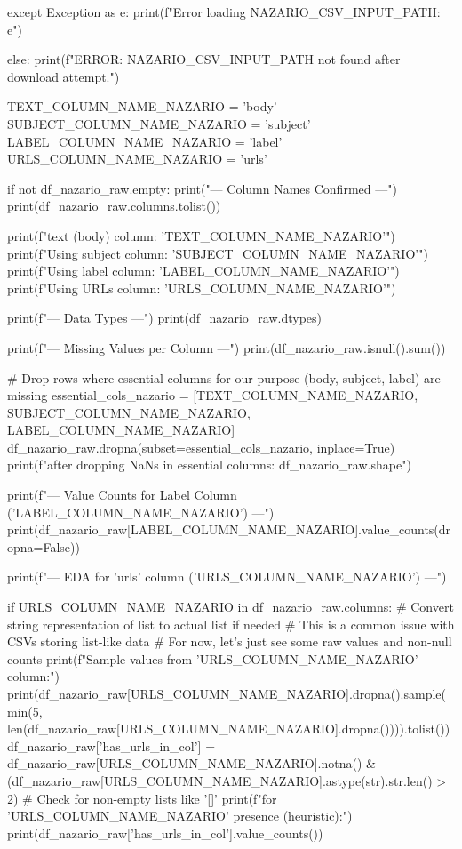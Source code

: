 \begin{ffcode}
    except Exception as e:
        print(f"Error loading {NAZARIO_CSV_INPUT_PATH}: {e}")

else:
    print(f"ERROR: {NAZARIO_CSV_INPUT_PATH} not found after download attempt.")

    TEXT_COLUMN_NAME_NAZARIO = 'body'
    SUBJECT_COLUMN_NAME_NAZARIO = 'subject'
    LABEL_COLUMN_NAME_NAZARIO = 'label'
    URLS_COLUMN_NAME_NAZARIO = 'urls'
    
    if not df_nazario_raw.empty:
        print("--- Column Names Confirmed ---")
        print(df_nazario_raw.columns.tolist())
    
        print(f"\nUsing text (body) column: '{TEXT_COLUMN_NAME_NAZARIO}'")
        print(f"Using subject column: '{SUBJECT_COLUMN_NAME_NAZARIO}'")
        print(f"Using label column: '{LABEL_COLUMN_NAME_NAZARIO}'")
        print(f"Using URLs column: '{URLS_COLUMN_NAME_NAZARIO}'")
    
        print(f"\n--- Data Types ---")
        print(df_nazario_raw.dtypes)
    
        print(f"\n--- Missing Values per Column ---")
        print(df_nazario_raw.isnull().sum())
    
        # Drop rows where essential columns for our purpose (body, subject, label) are missing
        essential_cols_nazario = [TEXT_COLUMN_NAME_NAZARIO, SUBJECT_COLUMN_NAME_NAZARIO, LABEL_COLUMN_NAME_NAZARIO]
        df_nazario_raw.dropna(subset=essential_cols_nazario, inplace=True)
        print(f"\nShape after dropping NaNs in essential columns: {df_nazario_raw.shape}")
    
        print(f"\n--- Value Counts for Label Column ('{LABEL_COLUMN_NAME_NAZARIO}') ---")
        print(df_nazario_raw[LABEL_COLUMN_NAME_NAZARIO].value_counts(dropna=False))
    
        print(f"\n--- EDA for 'urls' column ('{URLS_COLUMN_NAME_NAZARIO}') ---")
    
        if URLS_COLUMN_NAME_NAZARIO in df_nazario_raw.columns:
            # Convert string representation of list to actual list if needed
            # This is a common issue with CSVs storing list-like data
            # For now, let's just see some raw values and non-null counts
            print(f"Sample values from '{URLS_COLUMN_NAME_NAZARIO}' column:")
            print(df_nazario_raw[URLS_COLUMN_NAME_NAZARIO].dropna().sample(min(5, len(df_nazario_raw[URLS_COLUMN_NAME_NAZARIO].dropna()))).tolist())
            df_nazario_raw['has_urls_in_col'] = df_nazario_raw[URLS_COLUMN_NAME_NAZARIO].notna() & (df_nazario_raw[URLS_COLUMN_NAME_NAZARIO].astype(str).str.len() > 2) # Check for non-empty lists like '[]'
            print(f"\nCounts for '{URLS_COLUMN_NAME_NAZARIO}' presence (heuristic):")
            print(df_nazario_raw['has_urls_in_col'].value_counts())
    

\end{ffcode}
